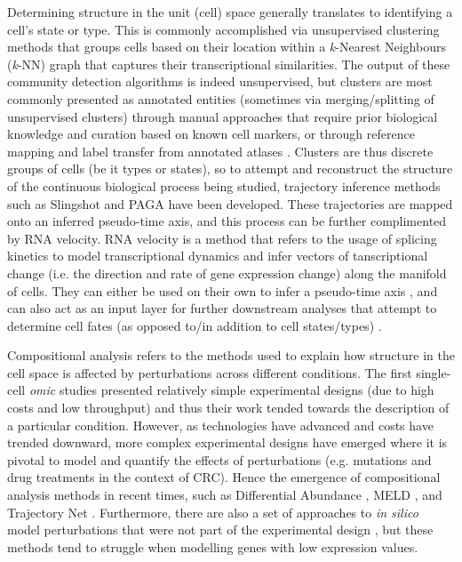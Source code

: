 Determining structure in the unit (cell) space generally translates to identifying a cell's state or type. This is commonly accomplished via unsupervised clustering methods that groups cells based on their location within a \emph{k}-Nearest Neighbours (\emph{k}-NN) graph that captures their transcriptional similarities. The output of these community detection algorithms \cite{blondel_fast_2008,traag_louvain_2019} is indeed unsupervised, but clusters are most commonly presented as annotated entities (sometimes via merging/splitting of unsupervised clusters) through manual approaches that require prior biological knowledge and curation based on known cell markers, or through reference mapping and label transfer from annotated atlases \cite{lotfollahi_mapping_2022}. Clusters are thus discrete groups of cells (be it types or states), so to attempt and reconstruct the structure of the continuous biological process being studied, trajectory inference methods such as Slingshot \cite{street_slingshot_2018} and PAGA \cite{wolf_paga_2019} have been developed. These trajectories are mapped onto an inferred pseudo-time axis, and this process can be further complimented by RNA velocity. RNA velocity \cite{la_manno_rna_2018} is a method that refers to the usage of splicing kinetics to model transcriptional dynamics and infer vectors of tanscriptional change (i.e. the direction and rate of gene expression change) along the manifold of cells. They can either be used on their own to infer a pseudo-time axis \cite{bergen_generalizing_2020}, and can also act as an input layer for further downstream analyses that attempt to determine cell fates (as opposed to/in addition to cell states/types) \cite{lange_cellrank_2022}.

Compositional analysis refers to the methods used to explain how structure in the cell space is affected by perturbations across different conditions. The first single-cell \emph{omic} studies presented relatively simple experimental designs (due to high costs and low throughput) and thus their work tended towards the description of a particular condition. However, as technologies have advanced and costs have trended downward, more complex experimental designs have emerged where it is pivotal to model and quantify the effects of perturbations (e.g. mutations and drug treatments in the context of CRC). Hence the emergence of compositional analysis methods in recent times, such as Differential Abundance \cite{lun_testing_2017,dann_differential_2022}, MELD \cite{burkhardt_quantifying_2021}, and Trajectory Net \cite{tong_trajectorynet_2020}. Furthermore, there are also a set of approaches to \emph{in silico} model perturbations that were not part of the experimental design \cite{lotfollahi_scgen_2019,yuan_cellbox_2021,lotfollahi_learning_2021}, but these methods tend to struggle when modelling genes with low expression values.

